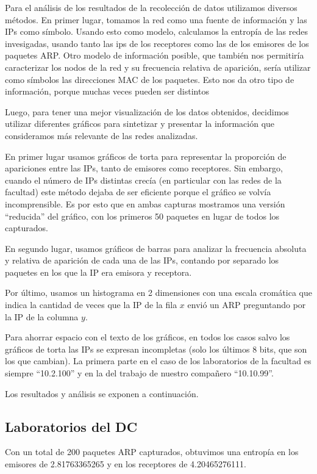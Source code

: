 Para el análisis de los resultados de la recolección de datos utilizamos
diversos métodos. En primer lugar, tomamos la red como una fuente de
información y las IPs como símbolo. Usando esto como modelo, calculamos la
entropía de las redes invesigadas, usando tanto las ips de los receptores como
las de los emisores de los paquetes ARP. Otro modelo de información posible,
que también nos permitiría caracterizar los nodos de la red y su frecuencia
relativa de aparición, sería utilizar como símbolos las direcciones MAC de los
paquetes. Esto nos da otro tipo de información, porque muchas veces pueden ser
distintos 

Luego, para tener una mejor visualización de los datos obtenidos, decidimos
utilizar diferentes gráficos para sintetizar y presentar la información que
consideramos más relevante de las redes analizadas.

En primer lugar usamos gráficos de torta para representar la proporción de
apariciones entre las IPs, tanto de emisores como receptores. Sin embargo,
cuando el número de IPs distintas crecía (en particular con las redes de la
facultad) este método dejaba de ser eficiente porque el gráfico se volvía
incomprensible. Es por esto que en ambas capturas mostramos una versión
``reducida'' del gráfico, con los primeros 50 paquetes en lugar de todos
los capturados.

En segundo lugar, usamos gráficos de barras para analizar la frecuencia
absoluta y relativa de aparición de cada una de las IPs, contando por separado
los paquetes en los que la IP era emisora y receptora.

Por último, usamos un histograma en 2 dimensiones con una escala cromática
que indica la cantidad de veces que la IP de la fila $x$ envió un ARP
preguntando por la IP de la columna $y$.

Para ahorrar espacio con el texto de los gráficos, en todos los casos salvo los
gráficos de torta las IPs se expresan incompletas (solo los últimos 8 bits, que
son los que cambian). La primera parte en el caso de los laboratorios de la
facultad es siempre ``10.2.100'' y en la del trabajo de nuestro compañero
``10.10.99''.

Los resultados y análisis se exponen a continuación.

\subsection{Laboratorios del DC}
Con un total de 200 paquetes ARP capturados, obtuvimos una entropía en los
emisores de 2.81763365265 y en los receptores de 4.20465276111.

